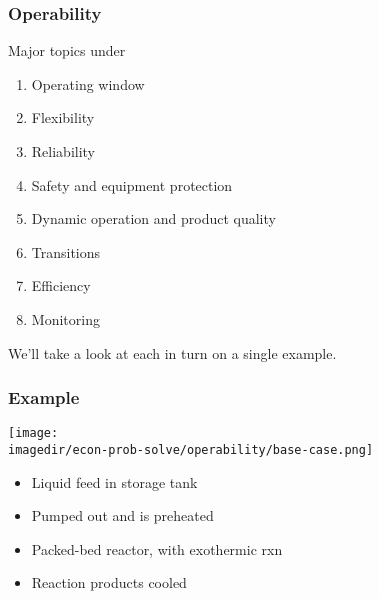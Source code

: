
\begin{frame}\frametitle{Operability}
	Major topics under {\color{myGreen}{Process Operability}}
	\begin{enumerate}
		\item	Operating window
		\item	Flexibility
		\item	Reliability
		\item	Safety and equipment protection
		\item	Dynamic operation and product quality
		\item	Transitions
		\item	Efficiency
		\item	Monitoring
	\end{enumerate}
	
	\vspace{12pt}
	We'll take a look at each in turn on a single example.
\end{frame}

\begin{frame}\frametitle{Example}
	\begin{center}
		\texttt{[image: \\imagedir/econ-prob-solve/operability/base-case.png]}
	\end{center}
	\vspace{-3cm}
	{\scriptsize
	\begin{itemize}
		\item	Liquid feed in storage tank
		\item	Pumped out and is preheated
		\item	Packed-bed reactor, with exothermic rxn
		\item	Reaction products cooled
	\end{itemize}}
\end{frame}

